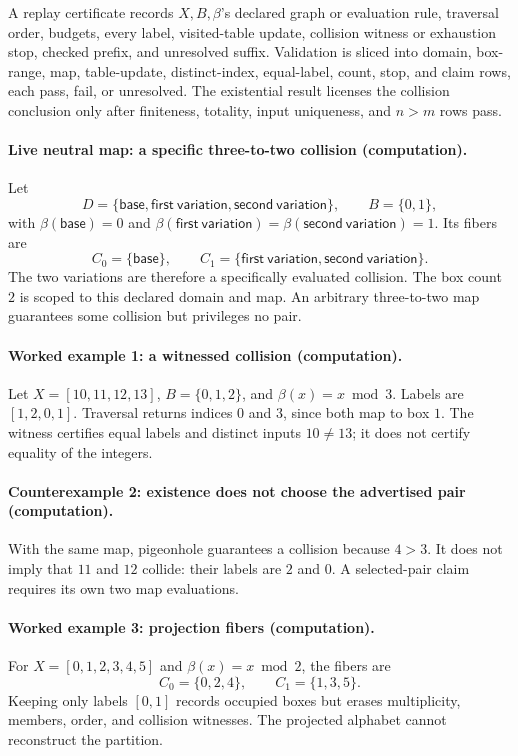 A replay certificate records \(X,B,\beta\)'s declared graph or evaluation rule, traversal order, budgets, every
label, visited-table update, collision witness or exhaustion stop, checked prefix, and unresolved suffix.  Validation
is sliced into domain, box-range, map, table-update, distinct-index, equal-label, count, stop, and claim rows, each
pass, fail, or unresolved.  The existential result licenses the collision conclusion only after finiteness,
totality, input uniqueness, and \(n>m\) rows pass.

\paragraph{Live neutral map: a specific three-to-two collision (computation).}
Let
\[
D=\{\mathsf{base},\mathsf{first\ variation},\mathsf{second\ variation}\},
\qquad B=\{0,1\},
\]
with \(\beta(\mathsf{base})=0\) and
\(\beta(\mathsf{first\ variation})=\beta(\mathsf{second\ variation})=1\).  Its fibers are
\[
C_0=\{\mathsf{base}\},\qquad
C_1=\{\mathsf{first\ variation},\mathsf{second\ variation}\}.
\]
The two variations are therefore a specifically evaluated collision.  The box count \(2\) is scoped to this declared
domain and map.  An arbitrary three-to-two map guarantees some collision but privileges no pair.

\paragraph{Worked example 1: a witnessed collision (computation).}
Let \(X=[10,11,12,13]\), \(B=\{0,1,2\}\), and \(\beta(x)=x\bmod3\).  Labels are
\([1,2,0,1]\).  Traversal returns indices \(0\) and \(3\), since both map to box \(1\).  The witness certifies equal
labels and distinct inputs \(10\ne13\); it does not certify equality of the integers.

\paragraph{Counterexample 2: existence does not choose the advertised pair (computation).}
With the same map, pigeonhole guarantees a collision because \(4>3\).  It does not imply that \(11\) and \(12\)
collide: their labels are \(2\) and \(0\).  A selected-pair claim requires its own two map evaluations.

\paragraph{Worked example 3: projection fibers (computation).}
For \(X=[0,1,2,3,4,5]\) and \(\beta(x)=x\bmod2\), the fibers are
\[
                         C_0=\{0,2,4\},\qquad C_1=\{1,3,5\}.
\]
Keeping only labels \([0,1]\) records occupied boxes but erases multiplicity, members, order, and collision witnesses.
The projected alphabet cannot reconstruct the partition.

